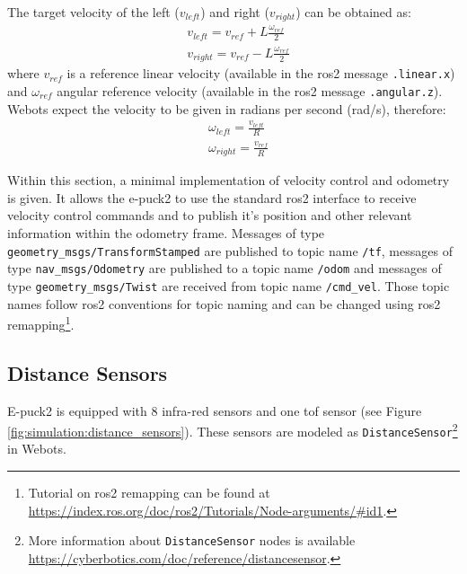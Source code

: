 The target velocity of the left ($v_{left}$) and right ($v_{right}$) can be obtained as:
\begin{equation}
\begin{aligned}
    & v_{left} = v_{ref} + L \frac{\omega_{ref}}{2} \\
    & v_{right} = v_{ref} - L \frac{\omega_{ref}}{2}
\end{aligned}
\end{equation}
where $ v_{ref}  $ is a reference linear velocity (available in the \ac{ros2} message \texttt{.linear.x}) and $ \omega_{ref} $ angular reference velocity (available in the \ac{ros2} message \texttt{.angular.z}). Webots expect the velocity to be given in radians per second (rad/s), therefore:
\begin{equation}
\begin{aligned}
    & \omega_{left} = \frac{v_{left}}{R} \\
    & \omega_{right} = \frac{v_{ref}}{R} 
\end{aligned}
\end{equation}

Within this section, a minimal implementation of velocity control and odometry is given.
It allows the e-puck2 to use the standard \ac{ros2} interface to receive velocity control commands and to publish it's position and other relevant information within the odometry frame.
Messages of type \texttt{geometry\_msgs/TransformStamped} are published to topic name \texttt{/tf}, messages of type \texttt{nav\_msgs/Odometry} are published to a topic name \texttt{/odom} and messages of type \texttt{geometry\_msgs/Twist} are received from topic name \texttt{/cmd\_vel}.
Those topic names follow \ac{ros2} conventions for topic naming and can be changed using \ac{ros2} remapping\footnote{Tutorial on \ac{ros2} remapping can be found at \url{https://index.ros.org/doc/ros2/Tutorials/Node-arguments/\#id1}.}. 

\subsection{Distance Sensors}
E-puck2 is equipped with 8 infra-red sensors and one \ac{tof} sensor (see Figure \ref{fig:simulation:distance_sensors}). These sensors are modeled as \texttt{DistanceSensor}\footnote{More information about \texttt{DistanceSensor} nodes is available \url{https://cyberbotics.com/doc/reference/distancesensor}.} in Webots.

